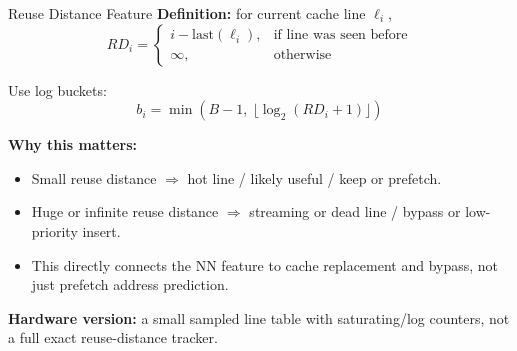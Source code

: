 \documentclass[10pt,aspectratio=169]{beamer}
\begin{document}
\begin{frame}{Reuse Distance Feature}
  \textbf{Definition:} for current cache line $\ell_i$,
  \[
      RD_i =
      \begin{cases}
      i - \mathrm{last}(\ell_i), & \text{if line was seen before}\\
      \infty, & \text{otherwise}
      \end{cases}
  \]

  \vspace{0.3em}
  Use log buckets:
  \[
      b_i = \min(B-1,\ \lfloor \log_2(RD_i + 1) \rfloor)
  \]

  \vspace{0.3em}
  \textbf{Why this matters:}
  \begin{itemize}
    \item Small reuse distance $\Rightarrow$ hot line / likely useful / keep or prefetch.
    \item Huge or infinite reuse distance $\Rightarrow$ streaming or dead line / bypass or low-priority insert.
    \item This directly connects the NN feature to cache replacement and bypass, not just prefetch address prediction.
  \end{itemize}

  \vspace{0.3em}
  \textbf{Hardware version:} a small sampled line table with saturating/log counters, not a full exact reuse-distance tracker.
\end{frame}
\end{document}
